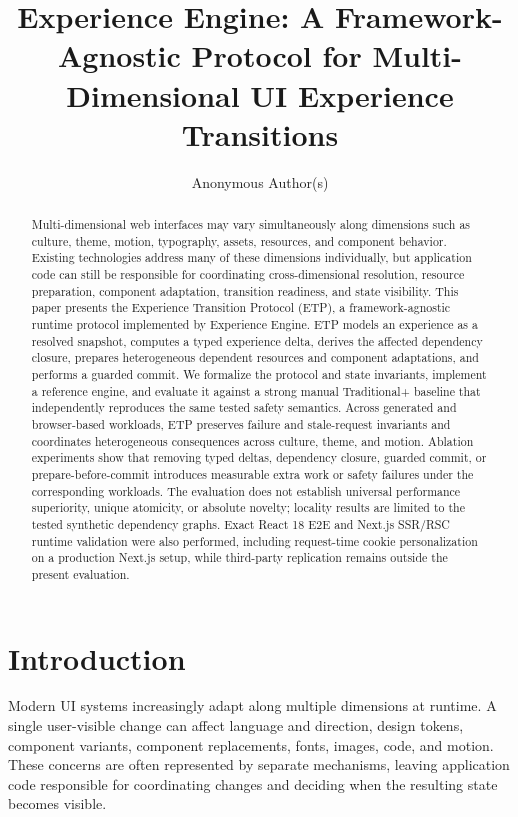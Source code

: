 \documentclass[manuscript,anonymous]{acmart}
\title{Experience Engine: A Framework-Agnostic Protocol for Multi-Dimensional UI Experience Transitions}
\author{Anonymous Author(s)}
\affiliation{\institution{Anonymous Institution}}
\begin{document}
\begin{abstract}
Multi-dimensional web interfaces may vary simultaneously along dimensions such as culture,
theme, motion, typography, assets, resources, and component behavior. Existing technologies
address many of these dimensions individually, but application code can still be responsible
for coordinating cross-dimensional resolution, resource preparation, component adaptation,
transition readiness, and state visibility. This paper presents the Experience Transition
Protocol (ETP), a framework-agnostic runtime protocol implemented by Experience Engine.
ETP models an experience as a resolved snapshot, computes a typed experience delta, derives
the affected dependency closure, prepares heterogeneous dependent resources and component
adaptations, and performs a guarded commit. We formalize the protocol and state invariants,
implement a reference engine, and evaluate it against a strong manual Traditional+ baseline
that independently reproduces the same tested safety semantics. Across generated and
browser-based workloads, ETP preserves failure and stale-request invariants and coordinates
heterogeneous consequences across culture, theme, and motion. Ablation experiments show
that removing typed deltas, dependency closure, guarded commit, or prepare-before-commit
introduces measurable extra work or safety failures under the corresponding workloads.
The evaluation does not establish universal performance superiority, unique atomicity, or
absolute novelty; locality results are limited to the tested synthetic dependency graphs.
Exact React 18 E2E and Next.js SSR/RSC runtime validation were also performed, including
request-time cookie personalization on a production Next.js setup, while third-party replication
remains outside the present evaluation.
\end{abstract}
\maketitle

\section{Introduction}
Modern UI systems increasingly adapt along multiple dimensions at runtime. A single
user-visible change can affect language and direction, design tokens, component variants,
component replacements, fonts, images, code, and motion. These concerns are often
represented by separate mechanisms, leaving application code responsible for coordinating
changes and deciding when the resulting state becomes visible.
\end{document}
